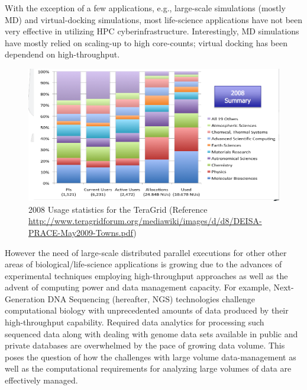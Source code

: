 \documentclass{sig-alternate}
\begin{document}


With the exception of a few applications, e.g., large-scale
simulations (mostly MD) and virtual-docking simulations, most
life-science applications have not been very effective in utilizing
HPC cyberinfrastructure.  Interestingly, MD simulations have mostly
relied on scaling-up to high core-counts; virtual docking has been
dependend on high-throughput.
\begin{figure}
 \centering
\includegraphics[scale=0.27]{figures/teragrid-discipline08}
\caption{\small 2008 Usage statistics for the TeraGrid (Reference
  \url{http://www.teragridforum.org/mediawiki/images/d/d8/DEISA-PRACE-May2009-Towns.pdf})}
  \label{tg2008}
\end{figure}
However the need of large-scale distributed parallel executions for
other other areas of biological/life-science applications is growing
due to the advances of experimental techniques employing
high-throughput approaches as well as the advent of computing power
and data management capacity.  For example, Next-Generation DNA
Sequencing (hereafter, NGS) technologies challenge computational
biology with unprecedented amounts of data produced by their
high-throughput capability.  Required data analytics for processing
such sequenced data along with dealing with genome data sets available
in public and private databases are overwhelmed by the pace of growing
data volume.  This poses the question of how the challenges with large
volume data-management as well as the computational requirements for
analyzing large volumes of data are effectively managed.
\end{document}

